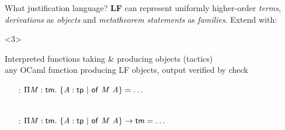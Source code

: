 \documentclass{beamer}
\theoremstyle{example}
\begin{document}
\begin{frame}{What justification language?}
  \textbf{LF} can represent uniformly higher-order \emph{terms},
  \emph{derivations} as \emph{objects} and \emph{metatheorem
    statements} as \emph{families}. \pause Extend with:
  \begin{overlayarea}\textwidth{18em}
    \begin{onlyenv}<3>
      \begin{block}{Interpreted functions} taking \& producing objects (tactics) \\
        {\footnotesize any OCaml function producing LF objects, output
          verified by \textsf{check}}
        \begin{examples}
          \small
          \begin{enumerate}[inline]
          \item[\const{infer} :] $\Pi{\ensuremath{\text{\textit{M}}}}:{\text{\textsf{tm}}}.\ 
            \{{\text{\textit{A}}}:{\text{\textsf{tp}}}\ |\ {{\text{\textsf{of}}}\ {\text{\textit{M}}}\ {\text{\textit{A}}}}\} = \ldots$ \\
            \\[1em]

          \item[\const{get} :] $\Pi{\ensuremath{\text{\textit{M}}}}:{\text{\textsf{tm}}}.\  \{{\text{\textit{A}}}:{\text{\textsf{tp}}}\ |\ {{\text{\textsf{of}}}\ {\text{\textit{M}}}\ {\text{\textit{A}}}}\}
            \to \text{\textsf{tm}}= \ldots$
            \\[1em]


\end{enumerate}
\end{examples}
\end{block}
\end{onlyenv}
\end{overlayarea}
\end{frame}
\end{document}
